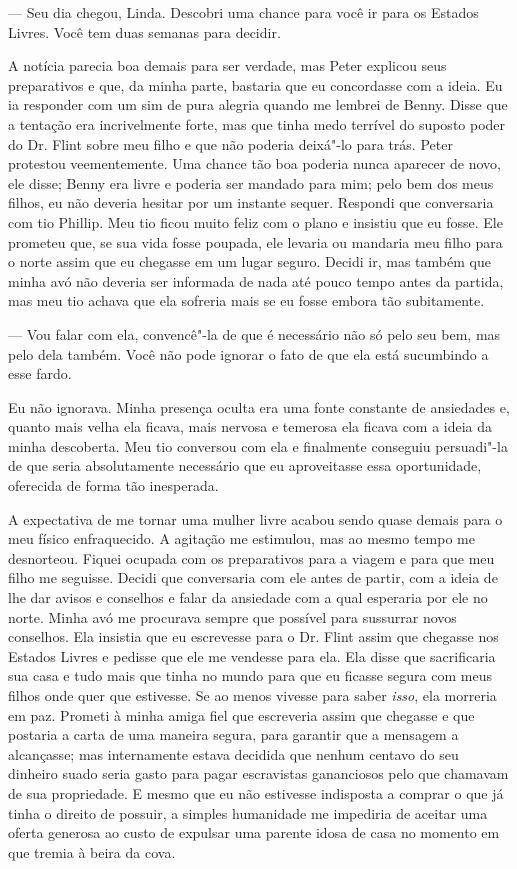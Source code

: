 --- Seu dia chegou, Linda. Descobri uma chance para você ir para os
Estados Livres. Você tem duas semanas para decidir.

A notícia parecia boa demais para ser verdade, mas Peter explicou seus
preparativos e que, da minha parte, bastaria que eu concordasse com a
ideia. Eu ia responder com um sim de pura alegria quando me lembrei de
Benny. Disse que a tentação era incrivelmente forte, mas que tinha medo
terrível do suposto poder do Dr. Flint sobre meu filho e que não poderia
deixá"-lo para trás. Peter protestou veementemente. Uma chance tão boa
poderia nunca aparecer de novo, ele disse; Benny era livre e poderia ser
mandado para mim; pelo bem dos meus filhos, eu não deveria hesitar por
um instante sequer. Respondi que conversaria com tio Phillip. Meu tio
ficou muito feliz com o plano e insistiu que eu fosse. Ele prometeu que,
se sua vida fosse poupada, ele levaria ou mandaria meu filho para o
norte assim que eu chegasse em um lugar seguro. Decidi ir, mas também
que minha avó não deveria ser informada de nada até pouco tempo antes da
partida, mas meu tio achava que ela sofreria mais se eu fosse embora tão
subitamente.

--- Vou falar com ela, convencê"-la de que é necessário não só pelo seu
bem, mas pelo dela também. Você não pode ignorar o fato de que ela está
sucumbindo a esse fardo.

Eu não ignorava. Minha presença oculta era uma fonte constante de
ansiedades e, quanto mais velha ela ficava, mais nervosa e temerosa ela
ficava com a ideia da minha descoberta. Meu tio conversou com ela e
finalmente conseguiu persuadi"-la de que seria absolutamente necessário
que eu aproveitasse essa oportunidade, oferecida de forma tão
inesperada.

A expectativa de me tornar uma mulher
livre acabou sendo quase demais para o meu físico enfraquecido. A
agitação me estimulou, mas ao mesmo tempo me desnorteou. Fiquei ocupada
com os preparativos para a viagem e para que meu filho me seguisse.
Decidi que conversaria com ele antes de partir, com a ideia de lhe dar
avisos e conselhos e falar da ansiedade com a qual esperaria por ele no
norte. Minha avó me procurava sempre que possível para sussurrar novos
conselhos. Ela insistia que eu escrevesse para o Dr. Flint assim que
chegasse nos Estados Livres e pedisse que ele me vendesse para ela. Ela
disse que sacrificaria sua casa e tudo mais que tinha no mundo para que
eu ficasse segura com meus filhos onde quer que estivesse. Se ao menos
vivesse para saber \emph{isso}, ela morreria em paz. Prometi à minha
amiga fiel que escreveria assim que chegasse e que postaria a carta de
uma maneira segura, para garantir que a mensagem a alcançasse; mas
internamente estava decidida que nenhum centavo do seu dinheiro suado
seria gasto para pagar escravistas gananciosos pelo que chamavam de sua
propriedade. E mesmo que eu não estivesse indisposta a comprar o que já
tinha o direito de possuir, a simples humanidade me impediria de aceitar
uma oferta generosa ao custo de expulsar uma parente idosa de casa no
momento em que tremia à beira da cova.

